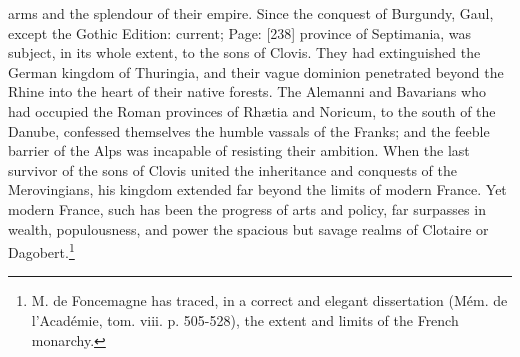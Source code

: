 arms and the splendour of their empire. Since the conquest of Burgundy, Gaul, except the Gothic Edition: current; Page: [238] province of Septimania, was subject, in its whole extent, to the sons of Clovis. They had extinguished the German kingdom of Thuringia, and their vague dominion penetrated beyond the Rhine into the heart of their native forests. The Alemanni and Bavarians who had occupied the Roman provinces of Rhætia and Noricum, to the south of the Danube, confessed themselves the humble vassals of the Franks; and the feeble barrier of the Alps was incapable of resisting their ambition. When the last survivor of the sons of Clovis united the inheritance and conquests of the Merovingians, his kingdom extended far beyond the limits of modern France. Yet modern France, such has been the progress of arts and policy, far surpasses in wealth, populousness, and power the spacious but savage realms of Clotaire or Dagobert.\footnote{M. de Foncemagne has traced, in a correct and elegant dissertation (Mém. de l\texthebrew{}’Académie, tom. viii. p. 505-528), the extent and limits of the French monarchy.}

